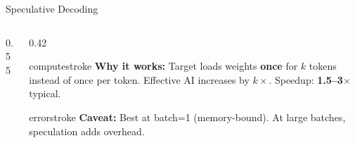 \documentclass[aspectratio=169, 12pt]{beamer}
\begin{document}
\begin{frame}{Speculative Decoding}
\begin{columns}[T]
\begin{column}{0.55\textwidth}
    \vspace{0.05cm}
  \end{column}
  \begin{column}{0.42\textwidth}
    \begin{mlsyscard}{computestroke}
    {\scriptsize\textbf{Why it works:} Target loads weights \textbf{once} for $k$ tokens instead of once per token. Effective AI increases by $k\times$. Speedup: \textbf{1.5--3$\times$} typical.}
    \end{mlsyscard}

    \vspace{0.1cm}
    \begin{mlsyscard}{errorstroke}
    {\scriptsize\textbf{Caveat:} Best at batch=1 (memory-bound). At large batches, speculation adds overhead.}
    \end{mlsyscard}
  \end{column}
\end{columns}

\end{frame}
\end{document}
